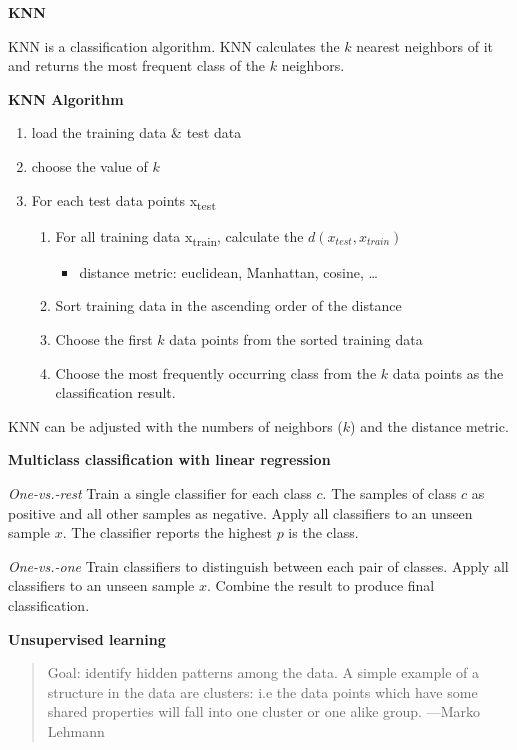 \documentclass[11pt,twoside,landscape]{article}
\begin{document}
\begin{multicols}{3}
\textbf{KNN}

KNN is a classification algorithm.
KNN calculates the \(k\) nearest neighbors of it and returns the most frequent class of the \(k\) neighbors.


\textbf{KNN Algorithm}

\begin{enumerate}
\item load the training data \& test data
\item choose the value of \(k\)
\item For each test data points x\textsubscript{test}
\begin{enumerate}
\item For all training data x\textsubscript{train}, calculate the \(d(x_{test}, x_{train})\)
\begin{itemize}
\item distance metric: euclidean, Manhattan, cosine, \ldots{}
\end{itemize}
\item Sort training data in the ascending order of the distance
\item Choose the first \(k\) data points from the sorted training data
\item Choose the most frequently occurring class from the \(k\) data points as the classification result.
\end{enumerate}
\end{enumerate}


KNN can be adjusted with the numbers of neighbors (\(k\)) and the distance metric.


\textbf{Multiclass classification with linear regression}

\emph{One-vs.-rest}
Train a single classifier for each class \(c\).
The samples of class \(c\) as positive and all other samples as negative.
Apply all classifiers to an unseen sample \(x\).
The classifier reports the highest \(p\) is the class.


\emph{One-vs.-one}
Train classifiers to distinguish between each pair of classes.
Apply all classifiers to an unseen sample \(x\).
Combine the result to produce final classification.

\textbf{Unsupervised learning}

\begin{quote}
Goal: identify hidden patterns among the data.
A simple example of a structure in the data
are clusters: i.e the data points which
have some shared properties will fall into
one cluster or one alike group. ---Marko Lehmann
\end{quote}



\end{multicols}
\end{document}
